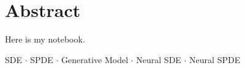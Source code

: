 \chapter*{Abstract}
Here is my notebook.

\mbox{}\linebreak
{} 
SDE $\cdot$ SPDE $\cdot$ Generative Model $\cdot$ Neural SDE $\cdot$ Neural SPDE